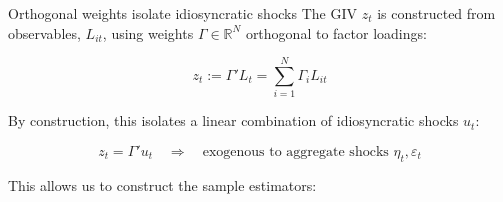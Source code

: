 \documentclass[aspectratio=169,11pt]{beamer}
\begin{document}
\begin{frame}{Orthogonal weights isolate idiosyncratic shocks} \label{app_propositions}
    \vspace{0.2cm}
    \centering
    The GIV $z_t$ is constructed from observables, $L_{it}$, using weights $\Gamma \in \mathbb{R}^N$ orthogonal to factor loadings:

    \vspace{0.1cm}
    \begin{equation*}
        z_t := \Gamma' L_t = \sum_{i=1}^{N} \Gamma_i L_{it}
    \end{equation*}

    \vspace{0.1cm}
    By construction, this isolates a linear combination of idiosyncratic shocks $u_t$:

    \vspace{0.1cm}
    \begin{equation*}
        z_t = \Gamma' u_t \quad \Rightarrow \quad \text{exogenous to aggregate shocks } \eta_t, \varepsilon_t
    \end{equation*}

    \vspace{0.2cm}
    This allows us to construct the sample estimators:
    \vspace{0.1cm}

    \vspace{0.1cm}
    \hfill \hyperlink{src_propositions}{}
\end{frame}
\end{document}
